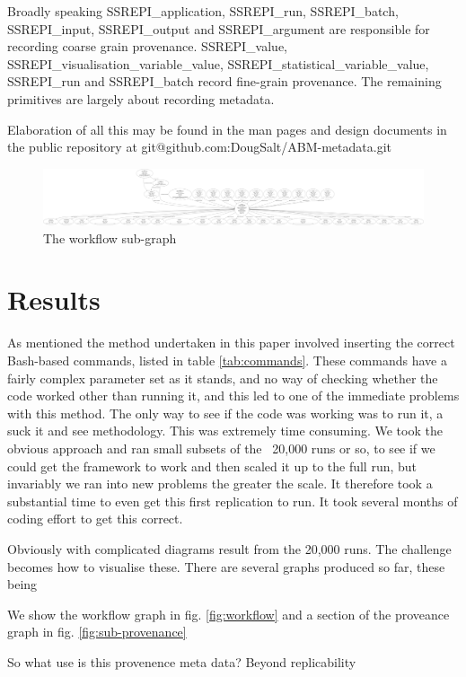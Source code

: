\documentclass[runningheads]{llncs}
\begin{document}
Broadly speaking SSREPI\_application, SSREPI\_run, SSREPI\_batch, SSREPI\_input,
SSREPI\_output and SSREPI\_argument are responsible for recording coarse grain
provenance. SSREPI\_value, SSREPI\_visualisation\_variable\_value, SSREPI\_statistical\_variable\_value, SSREPI\_run and SSREPI\_batch record fine-grain provenance. The remaining
primitives are largely about recording metadata.

Elaboration of all this may be found in the man pages and design documents in the public repository at git@github.com:DougSalt/ABM-metadata.git

\begin{figure}
\includegraphics[width=\textwidth]{img/workflow.pdf}
\caption{The workflow sub-graph} \label{fig:workflow.pdf}
\end{figure}


\section{Results}

As mentioned the method undertaken in this paper involved inserting the correct
Bash-based commands, listed in table \ref{tab:commands}. These commands
have a fairly complex parameter set as it stands, and no way of checking
whether the code worked other than running it, and this led to one of the
immediate problems with this method. The only way to see if the code was
working was to run it, a suck it and see methodology. This was extremely time consuming. We took the obvious approach and ran small subsets of
the ~20,000 runs or so, to see if we could get the framework to work and then scaled it up to the full run, but invariably we ran into new problems the greater the scale. It therefore took a substantial time to even get this first replication to run. It took several months of coding effort to get this correct. 

Obviously with complicated diagrams result from the 20,000 runs. The challenge becomes how to visualise these.
There are several graphs produced so far, these being 

We show the workflow graph in fig. \ref{fig:workflow} and a section of the
proveance graph in fig. \ref{fig:sub-provenance}

So what use is this provenence meta data? Beyond replicability
\end{document}
